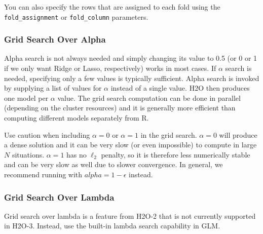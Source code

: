 You can also specify the rows that are assigned to each fold using the\\ \texttt{fold\_assignment}
or \texttt{fold\_column} parameters.

\bigskip
\waterExampleInR



\newpage
\subsubsection{Grid Search Over Alpha}

Alpha search is not always needed and simply changing its value to 0.5 (or 0 or 1 if we only want Ridge or Lasso,
respectively) works in most cases. If $\alpha$ search is needed, specifying only a few values is typically sufficient. Alpha
search is invoked by supplying a list of values for $\alpha$ instead of a single value. H2O then produces one model
per $\alpha$ value. The grid search computation can be done in parallel (depending on the cluster resources) and it
is generally more efficient than computing different models separately from R.

Use caution when including $\alpha=0$ or $\alpha=1$ in the grid search. $\alpha=0$ will produce a dense solution
and it can be very slow (or even impossible) to compute in large $N$ situations. $\alpha=1$ has no  $\ell_2$ penalty, so
it is therefore less numerically stable and can be very slow as well due to slower convergence. In general, we recommend running with $alpha=1-\epsilon$ instead.

\waterExampleInR


\subsubsection{Grid Search Over Lambda}


% 

Grid search over lambda is a feature from H2O-2 that is not currently supported in H2O-3.  Instead, use the built-in lambda
search capability in GLM.

